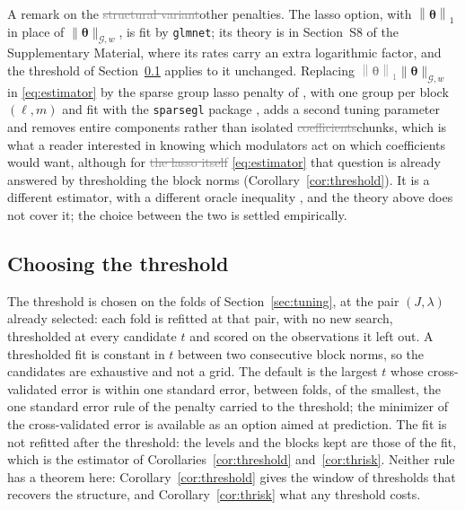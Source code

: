 \documentclass[12pt]{article} %
\theoremstyle{definition}
\theoremstyle{plain}
\newcommand{\norm}[1]{\left\lVert #1 \right\rVert}
\newcommand{\cv}{\ell}
\newcommand{\md}{m}
\newcommand{\btheta}{\boldsymbol{\theta}}
\newcommand{\pen}{\lambda}
\newcommand{\nGw}[1]{\lVert #1\rVert_{\mathcal{G},w}}
\begin{document}
A remark on the \textcolor{gray}{\sout{structural variant}}\textcolor{colR1}{other penalties}. \textcolor{colR1}{The lasso option, with
$\norm{\btheta}_1$ in place of $\nGw{\btheta}$, is fit by \texttt{glmnet}; its
theory is in Section~S8 of the Supplementary Material, where its rates carry
an extra logarithmic factor, and the threshold of Section~\ref{sec:threshold}
applies to it unchanged.} Replacing \textcolor{gray}{\sout{$\norm{\btheta}_1$}}\textcolor{colR1}{$\nGw{\btheta}$} in
\eqref{eq:estimator} by the sparse group lasso penalty of
\citet{Simon-Friedman-Hastie-Tibshirani-2013}, with one group per block
$(\cv,\md)$ \textcolor{colR1}{and fit with the \texttt{sparsegl} package
\citep{Liang-Cohen-SolonHeinsfeld-Pestilli-McDonald-2024}}, adds a second tuning parameter and removes entire components
rather than isolated \textcolor{gray}{\sout{coefficients}}\textcolor{colR1}{chunks}, which is what a reader interested in
knowing which modulators act on which coefficients would want\textcolor{colR1}{, although for}
\textcolor{gray}{\sout{the lasso itself}} \textcolor{colR1}{\eqref{eq:estimator}} \textcolor{colR1}{that question is already answered by thresholding the block
norms (Corollary~\ref{cor:threshold})}. It is a
different estimator, with a different oracle inequality
\citep{Lounici-Pontil-vandeGeer-Tsybakov-2011}, and the theory above does not
cover it; the choice between the two is settled empirically.

{\color{colR1}
\subsection{Choosing the threshold}
\label{sec:threshold}

The threshold is chosen on the folds of Section~\ref{sec:tuning}, at the pair
$(J,\pen)$ already selected: each fold is refitted at that pair, with no new
search, thresholded at every candidate $t$ and scored on the observations it
left out. A thresholded fit is constant in $t$ between two consecutive block
norms, so the candidates are exhaustive and not a grid. The default is the
largest $t$ whose cross-validated error is within one standard error, between
folds, of the smallest, the one standard error rule of the penalty carried to
the threshold; the minimizer of the cross-validated error is available as an
option aimed at prediction. The fit is not refitted after the threshold: the
levels and the blocks kept are those of the fit, which is the estimator of
Corollaries~\ref{cor:threshold} and~\ref{cor:thrisk}. Neither rule has a
theorem here: Corollary~\ref{cor:threshold} gives the window of thresholds
that recovers the structure, and Corollary~\ref{cor:thrisk} what any threshold
costs.
}
\end{document}
